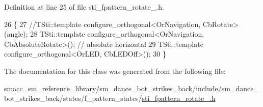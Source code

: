 Definition at line 25 of file sti\+\_\+fpattern\+\_\+rotate\+\_.\+h.


\begin{DoxyCode}
26   \{
27     \textcolor{comment}{//TSti::template configure\_orthogonal<OrNavigation, CbRotate>(angle);}
28     TSti::template configure\_orthogonal<OrNavigation, CbAbsoluteRotate>(); \textcolor{comment}{// absolute horizontal}
29     TSti::template configure\_orthogonal<OrLED, CbLEDOff>();
30   \}
\end{DoxyCode}


The documentation for this class was generated from the following file\+:\begin{DoxyCompactItemize}
\item 
smacc\+\_\+sm\+\_\+reference\+\_\+library/sm\+\_\+dance\+\_\+bot\+\_\+strikes\+\_\+back/include/sm\+\_\+dance\+\_\+bot\+\_\+strikes\+\_\+back/states/f\+\_\+pattern\+\_\+states/\hyperlink{sm__dance__bot__strikes__back_2include_2sm__dance__bot__strikes__back_2states_2f__pattern__states_2sti__fpattern__rotate__2_8h}{sti\+\_\+fpattern\+\_\+rotate\+\_.\+h}\end{DoxyCompactItemize}
